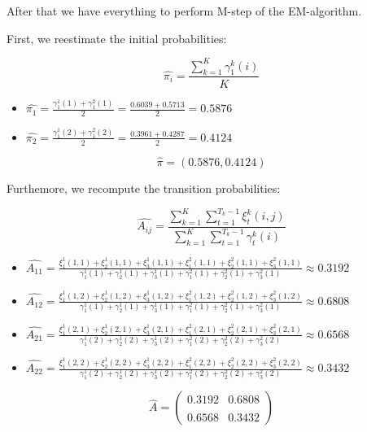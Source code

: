 \documentclass[11pt,a4paper]{article}
\begin{document}
	
	
	After that we have everything to perform M-step of the EM-algorithm.
	
	First, we reestimate the initial probabilities:
	
	$$\widehat{\pi_i} = \frac{\sum_{k=1}^K \gamma_1^k(i)}{K} $$
	
	\begin{itemize}
		\item $ \widehat{\pi_1} = \frac{ \gamma_1^1(1) +  \gamma_1^2(1)}{2} = \frac{ 0.6039 + 0.5713}{2} = 0.5876$
		\item $ \widehat{\pi_2}= \frac{ \gamma_1^1(2) +  \gamma_1^2(2)}{2} = \frac{ 0.3961 + 0.4287}{2} = 0.4124$
	\end{itemize}	
	
	$$ \widehat{\pi} = (0.5876, 0.4124) $$
	
	Furthemore, we recompute the transition probabilities:
	
	$$ \widehat{A_{ij}} = \frac{\sum_{k=1}^K \sum_{t = 1}^{T_k - 1} \xi_t^k(i, j) }{\sum_{k=1}^K \sum_{t = 1}^{T_k - 1} \gamma_t^k(i) } $$
	
	\begin{itemize}
		\item $ \widehat{A_{11}} = \frac{\xi_1^1(1, 1) + \xi_2^1(1, 1) + \xi_3^1(1, 1) + \xi_1^2(1, 1) + \xi_2^2(1, 1)+ \xi_3^2(1, 1) }{ \gamma_1^1(1) + \gamma_2^1(1) + \gamma_3^1(1) + \gamma_1^2(1) + \gamma_2^2(1) + \gamma_3^2(1)} \approx 0.3192 $ 
		\item $ \widehat{A_{12}} = \frac{\xi_1^1(1, 2) + \xi_2^1(1, 2) + \xi_3^1(1, 2) + \xi_1^2(1, 2) + \xi_2^2(1, 2)+ \xi_3^2(1, 2) }{ \gamma_1^1(1) + \gamma_2^1(1) + \gamma_3^1(1) + \gamma_1^2(1) + \gamma_2^2(1) + \gamma_3^2(1)} \approx 0.6808 $ 
		\item $ \widehat{A_{21}} = \frac{\xi_1^1(2, 1) + \xi_2^1(2, 1) + \xi_3^1(2, 1) + \xi_1^2(2, 1) + \xi_2^2(2, 1)+ \xi_3^2(2, 1) }{ \gamma_1^1(2) + \gamma_2^1(2) + \gamma_3^1(2) + \gamma_1^2(2) + \gamma_2^2(2) + \gamma_3^2(2)} \approx 0.6568 $ 
		\item $ \widehat{A_{22}} = \frac{\xi_1^1(2, 2) + \xi_2^1(2, 2) + \xi_3^1(2, 2) + \xi_1^2(2, 2) + \xi_2^2(2, 2)+ \xi_3^2(2, 2) }{ \gamma_1^1(2) + \gamma_2^1(2) + \gamma_3^1(2) + \gamma_1^2(2) + \gamma_2^2(2) + \gamma_3^2(2)} \approx 0.3432 $ 
	\end{itemize}
	
	
	$$ \widehat{A} = \left(\begin{smallmatrix} 0.3192 & 0.6808  \\ \\ 0.6568 & 0.3432  \end{smallmatrix} \right)$$
	
\end{document}
